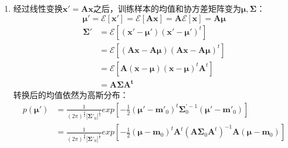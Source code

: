 \documentclass[a4paper,11pt,onecolumn,oneside,UTF8]{article}
\begin{document}
\begin{enumerate}
$$\begin{aligned}
                  \left[\left(2\pi\right)^d|\bm\Sigma|\right]-\sum\limits_{k=1}^n \left[\frac{1}{2}\right.
                  \left(\bm x_k-\bm\mu\right)^t\bm\Sigma^{-1}\left(\bm x_k-\bm \mu\right)\right]\right.             \\
                               & \left.\times\left[\frac{1}{\left(2\pi\right)^\frac{d}{2}|\bm\Sigma_0|^\frac{1}{2}}
                      exp[-\frac{1}{2}\left(\bm\mu-\bm m_0\right)^t\bm\Sigma_0^{-1}\left(\bm\mu-\bm m_0\right)]
                      \right]\right\}
              \end{aligned}
          $$
    \item 经过线性变换$\bm x' = \bm{Ax}$之后，训练样本的均值和协方差矩阵变为$\bm\mu, \bm\Sigma$：
          $$
              \bm\mu' = \mathcal{E} \left[\bm x'\right] = \mathcal{E} \left[\bm {Ax}\right]
              = \bm A\mathcal{E} \left[\bm x\right] = \bm{A\mu}
          $$
          $$
              \begin{aligned}
                  \bm\Sigma' & = \mathcal{E} \left[\left(\bm x'-\bm \mu'\right)\left(\bm x'-\bm\mu'
                  \right)^t\right]                                                                     \\
                             & = \mathcal{E} \left[\left(\bm {Ax} -\bm {A\mu} \right)
                  \left(\bm {Ax} -\bm{A\mu} \right)^t\right]                                           \\
                             & = \mathcal{E} \left[\bm A\left(\bm x -\bm\mu \right)\left(\bm x -\bm\mu
                  \right)^t\bm A^t\right]                                                              \\
                             & = \bm {A\Sigma A^t}
              \end{aligned}
          $$
          转换后的均值依然为高斯分布：
          $$
              \begin{aligned}
                  p\left(\bm\mu'\right) & = \frac{1}{\left(2\pi\right)^\frac{d}{2}|\bm\Sigma'_0|^\frac{1}{2}}
                  exp[-\frac{1}{2}\left(\bm\mu'-\bm m'_0\right)^t\bm\Sigma_0^{'-1}\left(\bm\mu'-\bm m'_0\right)] \\
                                        & = \frac{1}{\left(2\pi\right)^\frac{d}{2}|\bm\Sigma'_0|^\frac{1}{2}}
                  exp[-\frac{1}{2}\left(\bm\mu-\bm m_0\right)^t\bm A^t\left(\bm A\bm\Sigma_0\bm A^t\right)^{-1}
                  \bm A\left(\bm\mu-\bm m_0\right)]                                                              \\

\end{aligned}$$
\end{enumerate}
\end{document}
